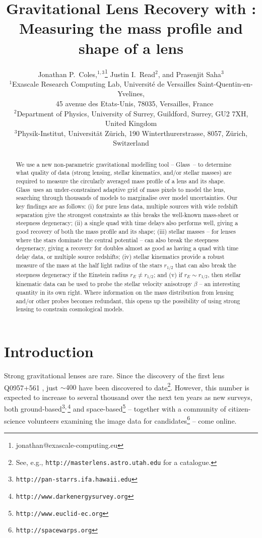\documentclass[galley,usenatbib]{mn2e}
\title[Lens Recovery with \Glass]{Gravitational Lens Recovery with \Glass: Measuring the mass profile and shape of a lens}
\author[J.~P.~Coles~et~al.]{%
Jonathan P.~Coles,$^{1,3}$\thanks{jonathan@exascale-computing.eu}%
\newauthor%
Justin I.~Read$^2$,%
\newauthor%
and Prasenjit Saha$^3$%
%
\\
$^1$Exascale Research Computing Lab, Universit\'e de Versailles Saint-Quentin-en-Yvelines,\\$\quad$45 avenue des Etats-Unis, 78035, Versailles, France\\
$^2$Department of Physics, University of Surrey, Guildford, Surrey, GU2 7XH, United Kingdom \\
$^3$Physik-Institut, Universit\"at Z\"urich, 190 Winterthurerstrasse, 8057, Z\"urich, Switzerland
}
\newcommand{\Glass}{{\sc Glass}}
\newcommand{\url}[1]{\tt #1}
\begin{document}
\maketitle

\begin{abstract}
We use a new non-parametric gravitational modelling tool -- \Glass\ -- to
determine what quality of data (strong lensing, stellar kinematics, and/or
stellar masses) are required to measure the circularly averaged mass profile of
a lens and its shape. \Glass\ uses an under-constrained adaptive grid of mass
pixels to model the lens, searching through thousands of models to marginalise
over model uncertainties. Our key findings are as follows: (i) for pure lens
data, multiple sources with wide redshift separation give the strongest
constraints as this breaks the well-known mass-sheet or steepness degeneracy;
(ii) a single quad with time delays also performs well, giving a good recovery
of both the mass profile and its shape; (iii) stellar masses -- for lenses
where the stars dominate the central potential -- can also break the steepness
degeneracy, giving a recovery for doubles almost as good as having a quad with time delay data, or
multiple source redshifts; (iv) stellar kinematics provide a robust measure of
the mass at the half light radius of the stars $r_{1/2}$ that can also break
the steepness degeneracy if the Einstein radius $r_E \neq r_{1/2}$; and (v)
if $r_E \sim r_{1/2}$, then stellar kinematic data can be used to probe the
stellar velocity anisotropy $\beta$ -- an interesting quantity in its own
right. Where information on the mass distribution from lensing and/or other
probes becomes redundant, this opens up the possibility of using strong lensing
to constrain cosmological models. 
\end{abstract}

\section{Introduction}\label{sec:intro}

Strong gravitational lenses are rare. Since the discovery of the first lens
Q0957+561 \citep{1979Natur.279..381W}, just $\sim400$ have been discovered to
date\footnote{See, e.g., {\url{http://masterlens.astro.utah.edu}} for a catalogue.}.
However, this number is expected to increase to several thousand over the next
ten years as new surveys, both
ground-based\footnote{\url{http://pan-starrs.ifa.hawaii.edu}}$^{\rm,}$\footnote{\url{http://www.darkenergysurvey.org}}
and space-based\footnote{\url{http://www.euclid-ec.org}} -- together with a community
of citizen-science volunteers examining the image data for
candidates\footnote{\url{http://spacewarps.org}} -- come online. 
\end{document}
